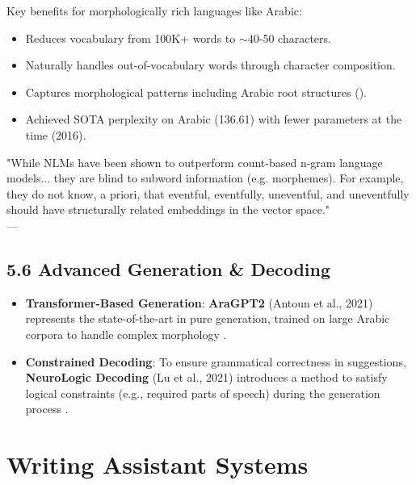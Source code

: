\documentclass{article}
\begin{document}
Key benefits for morphologically rich languages like Arabic:
\begin{itemize}
    \item Reduces vocabulary from 100K+ words to $\sim$40-50 characters.
    \item Naturally handles out-of-vocabulary words through character composition.
    \item Captures morphological patterns including Arabic root structures ().
    \item Achieved SOTA perplexity on Arabic (136.61) with fewer parameters at the time (2016).
\end{itemize}

\begin{tcolorbox}[quotebox]
"While NLMs have been shown to outperform count-based n-gram language models... they are blind to subword information (e.g. morphemes). For example, they do not know, a priori, that eventful, eventfully, uneventful, and uneventfully should have structurally related embeddings in the vector space." \\
\raggedleft — \cite{kim2016character}
\end{tcolorbox}

\subsection*{5.6 Advanced Generation \& Decoding}
\begin{itemize}
    \item \textbf{Transformer-Based Generation}: \textbf{AraGPT2} (Antoun et al., 2021) represents the state-of-the-art in pure generation, trained on large Arabic corpora to handle complex morphology \cite{antoun2021aragpt2}.
    \item \textbf{Constrained Decoding}: To ensure grammatical correctness in suggestions, \textbf{NeuroLogic Decoding} (Lu et al., 2021) introduces a method to satisfy logical constraints (e.g., required parts of speech) during the generation process \cite{lu2021neurologic}.
\end{itemize}

\section{\textcolor{accentred}{Writing Assistant Systems}}
\end{document}
